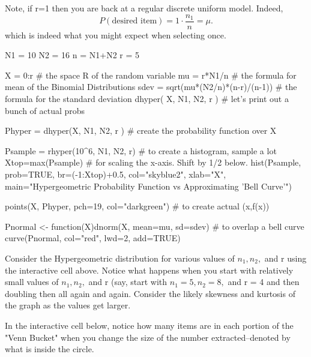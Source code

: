 \documentclass[10pt,]{book}
\numberwithin{equation}{section}
\begin{document}
%
\par
\hypertarget{p-843}{}%
Note, if r=1 then you are back at a regular discrete uniform model. Indeed,%
\begin{equation*}
P(\text{desired item}) = 1 \cdot \frac{n_1}{n} = \mu .
\end{equation*}
which is indeed what you might expect when selecting once.%
\par
\hypertarget{p-844}{}%
\leavevmode%
\begin{sageinput}
N1 = 10
N2 = 16
n = N1+N2
r = 5

X = 0:r        # the space R of the random variable 
mu = r*N1/n      # the formula for mean of the Binomial Distributions
sdev = sqrt(mu*(N2/n)*(n-r)/(n-1))  # the formula for the standard deviation
dhyper( X, N1, N2, r )   # let's print out a bunch of actual probs

Phyper = dhyper(X, N1, N2, r )  # create the probability function over X

Psample = rhyper(10^6, N1, N2, r)  # to create a histogram, sample a lot
Xtop=max(Psample)          # for scaling the x-axis. Shift by 1/2 below.
hist(Psample, prob=TRUE, br=(-1:Xtop)+0.5, col="skyblue2", xlab="X", 
  main="Hypergeometric Probability Function vs Approximating 'Bell Curve'")

points(X, Phyper, pch=19, col="darkgreen")  # to create actual (x,f(x))

Pnormal <- function(X){dnorm(X, mean=mu, sd=sdev)}   # to overlap a bell curve
curve(Pnormal, col="red", lwd=2, add=TRUE)
\end{sageinput}
%
\par
\hypertarget{p-845}{}%
Consider the Hypergeometric distribution for various values of \(n_1, n_2,\) and r using the interactive cell above. Notice what happens when you start with relatively small values of \(n_1, n_2,\) and r (say, start with \(n_1 = 5, n_2 = 8,\) and r = 4 and then doubling then all again and again. Consider the likely skewness and kurtosis of the graph as the values get larger.%
\par
\hypertarget{p-846}{}%
In the interactive cell below, notice how many items are in each portion of the "Venn Bucket" when you change the size of the number extracted--denoted by what is inside the circle.%
\end{document}

